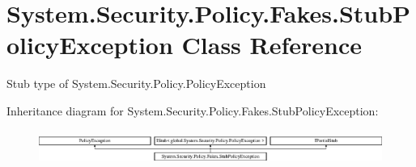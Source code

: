 \hypertarget{class_system_1_1_security_1_1_policy_1_1_fakes_1_1_stub_policy_exception}{\section{System.\-Security.\-Policy.\-Fakes.\-Stub\-Policy\-Exception Class Reference}
\label{class_system_1_1_security_1_1_policy_1_1_fakes_1_1_stub_policy_exception}
}


Stub type of System.\-Security.\-Policy.\-Policy\-Exception 


Inheritance diagram for System.\-Security.\-Policy.\-Fakes.\-Stub\-Policy\-Exception\-:\begin{figure}[H]
\begin{center}
\leavevmode
\includegraphics[height=1.117764cm]{class_system_1_1_security_1_1_policy_1_1_fakes_1_1_stub_policy_exception}
\end{center}
\end{figure}
